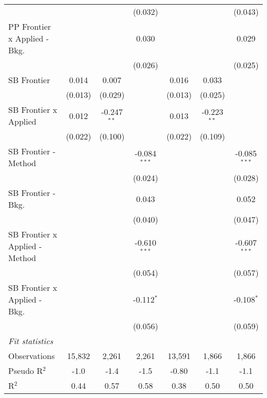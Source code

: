 \begin{tabular}{lcccccc}
                                  &             &               & (0.032)        &               &               & (0.043)\\   
   PP Frontier x Applied - Bkg.   &             &               & 0.030          &               &               & 0.029\\   
                                  &             &               & (0.026)        &               &               & (0.025)\\   
   SB Frontier                    & 0.014       & 0.007         &                & 0.016         & 0.033         &   \\   
                                  & (0.013)     & (0.029)       &                & (0.013)       & (0.025)       &   \\   
   SB Frontier x Applied          & 0.012       & -0.247$^{**}$ &                & 0.013         & -0.223$^{**}$ &   \\   
                                  & (0.022)     & (0.100)       &                & (0.022)       & (0.109)       &   \\   
   SB Frontier - Method           &             &               & -0.084$^{***}$ &               &               & -0.085$^{***}$\\   
                                  &             &               & (0.024)        &               &               & (0.028)\\   
   SB Frontier - Bkg.             &             &               & 0.043          &               &               & 0.052\\   
                                  &             &               & (0.040)        &               &               & (0.047)\\   
   SB Frontier x Applied - Method &             &               & -0.610$^{***}$ &               &               & -0.607$^{***}$\\   
                                  &             &               & (0.054)        &               &               & (0.057)\\   
   SB Frontier x Applied - Bkg.   &             &               & -0.112$^{*}$   &               &               & -0.108$^{*}$\\   
                                  &             &               & (0.056)        &               &               & (0.059)\\   
   \midrule
   \emph{Fit statistics}\\
   Observations                   & 15,832      & 2,261         & 2,261          & 13,591        & 1,866         & 1,866\\  
   Pseudo R$^2$                   & -1.0        & -1.4          & -1.5           & -0.80         & -1.1          & -1.1\\  
   R$^2$                          & 0.44        & 0.57          & 0.58           & 0.38          & 0.50          & 0.50\\  
   

\end{tabular}
